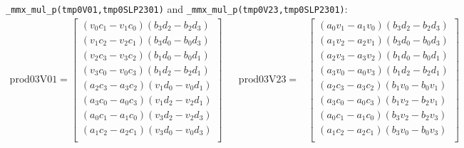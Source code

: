 \documentclass[fontsize = 10pt,DIV = 13]{scrartcl}
\newcommand{\pth}[1]{\left(#1\right)}
\begin{document}
\texttt{_mmx_mul_p(tmp0V01,tmp0SLP2301)} and \newline
\texttt{_mmx_mul_p(tmp0V23,tmp0SLP2301)}:
\begin{align*}
\mathrm{prod03V01} 
=
\begin{bmatrix}
\pth{v_0c_1 - v_1c_0}\pth{b_3d_2 - b_2d_3}\\
\pth{v_1c_2 - v_2c_1}\pth{b_3d_0 - b_0d_3}\\
\pth{v_2c_3 - v_3c_2}\pth{b_1d_0 - b_0d_1}\\
\pth{v_3c_0 - v_0c_3}\pth{b_1d_2 - b_2d_1}\\
\pth{a_2c_3 - a_3c_2}\pth{v_1d_0 - v_0d_1}\\
\pth{a_3c_0 - a_0c_3}\pth{v_1d_2 - v_2d_1}\\
\pth{a_0c_1 - a_1c_0}\pth{v_3d_2 - v_2d_3}\\
\pth{a_1c_2 - a_2c_1}\pth{v_3d_0 - v_0d_3}\\
\end{bmatrix}
&&
\mathrm{prod03V23} 
=&
\begin{bmatrix}
\pth{a_0v_1 - a_1v_0}\pth{b_3d_2 - b_2d_3}\\
\pth{a_1v_2 - a_2v_1}\pth{b_3d_0 - b_0d_3}\\
\pth{a_2v_3 - a_3v_2}\pth{b_1d_0 - b_0d_1}\\
\pth{a_3v_0 - a_0v_3}\pth{b_1d_2 - b_2d_1}\\
\pth{a_2c_3 - a_3c_2}\pth{b_1v_0 - b_0v_1}\\
\pth{a_3c_0 - a_0c_3}\pth{b_1v_2 - b_2v_1}\\
\pth{a_0c_1 - a_1c_0}\pth{b_3v_2 - b_2v_3}\\
\pth{a_1c_2 - a_2c_1}\pth{b_3v_0 - b_0v_3}\\
\end{bmatrix}
\end{align*}
\end{document}
